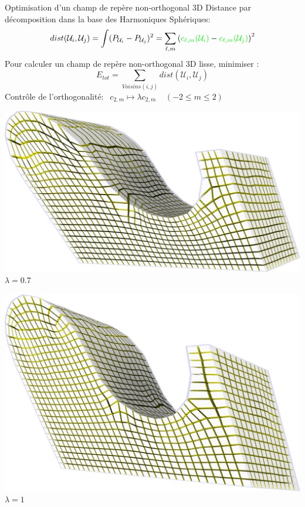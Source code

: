 \begin{frame}{Optimisation d'un champ de repère non-orthogonal 3D}
    \centering
    \footnotesize
    Distance par décomposition dans la base des Harmoniques Sphériques:
    $$ dist(\mathcal{U}_i, \mathcal{U}_j) = \int (P_{\mathcal{U}_i} - P_{\mathcal{U}_j})^2 = \sum_{\ell, m} \left({\color{green}c_{\ell,m}(\mathcal{U}_i)} - {\color{green}c_{\ell,m}(\mathcal{U}_j)} \right)^2$$
    Pour calculer un champ de repère non-orthogonal 3D lisse, minimiser :
    $$ E_{tot} = \sum_{Voisins(i, j)} dist(\mathcal{U}_i, \mathcal{U}_j)$$
    Contrôle de l'orthogonalité: $\ \ c_{2,m} \mapsto \lambda c_{2,m} \ \ \ \ \ (-2 \leq m \leq 2)$ %
    
    \begin{minipage}[b]{0.33\textwidth}
        \centering
        \includegraphics[width=\textwidth]{img_spm_ff/shear_0_7.png}
        $\lambda = 0.7$
    \end{minipage}
    \begin{minipage}[b]{0.28\textwidth}
        \centering
        \includegraphics[width=\textwidth]{img_spm_ff/shear_1.png}
        $\lambda = 1$
    \end{minipage}
    
    \normalsize
\end{frame} 
